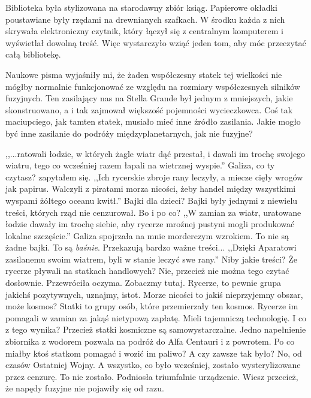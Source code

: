 Biblioteka była stylizowana na starodawny zbiór ksiąg.
Papierowe okładki poustawiane były rzędami na drewnianych szafkach.
W środku każda z nich skrywała elektroniczny czytnik, który łączył się z centralnym komputerem i wyświetlał dowolną treść.
Więc wystarczyło wziąć jeden tom, aby móc przeczytać całą bibliotekę.

Naukowe pisma wyjaśniły mi, że żaden współczesny statek tej wielkości nie mógłby normalnie funkcjonować ze względu na rozmiary współczesnych silników fuzyjnych.
Ten zasilający nas na Stella Grande był jednym z mniejszych, jakie skonstruowano, a i tak zajmował większość pojemności wycieczkowca.
Coś tak maciupciego, jak tamten statek, musiało mieć inne źródło zasilania.
Jakie mogło być inne zasilanie do podróży międzyplanetarnych, jak nie fuzyjne?

\begin{dialogue}
	\ds{} ,,...ratowali łodzie, w których żagle wiatr dąć przestał, i dawali im trochę swojego wiatru, tego co wcześniej razem łapali na wietrznej wyspie.''
	\ds{} Galiza, co ty czytasz? \dm{} zapytałem się.
	\ds{} ,,Ich rycerskie zbroje rany leczyły, a miecze cięły wrogów jak papirus. Walczyli z piratami morza nicości, żeby handel między wszystkimi wyspami żółtego oceanu kwitł.''
	\ds{} Bajki dla dzieci? \dm{} Bajki były jednymi z niewielu treści, których rząd nie cenzurował. Bo i po co?
	\ds{} ,,W zamian za wiatr, uratowane łodzie dawały im trochę siebie, aby rycerze mroźnej pustyni mogli produkować lokalne szczęście.'' \dm{} Galiza spojrzała na mnie morderczym wzrokiem. \dm{} To nie są żadne bajki. To są \emph{baśnie}. Przekazują bardzo ważne treści... ,,Dzięki Aparatowi zasilanemu swoim wiatrem, byli w stanie leczyć swe rany.''
	\ds{} Niby jakie treści? Że rycerze pływali na statkach handlowych?
	\ds{} Nie, przecież nie można tego czytać dosłownie. \dm{} Przewróciła oczyma. \dm{} Zobaczmy tutaj. Rycerze, to pewnie grupa jakichś pozytywnych, uznajmy, istot. Morze nicości to jakiś nieprzyjemny obszar, może kosmos? Statki to grupy osób, które przemierzały ten kosmos. Rycerze im pomagali w zamian za jakąś nietypową zapłatę. Mieli tajemniczą technologię.
	\ds{} I co z tego wynika? Przecież statki kosmiczne są samowystarczalne. Jedno napełnienie zbiornika z wodorem pozwala na podróż do Alfa Centauri i z powrotem. Po co miałby ktoś statkom pomagać i wozić im paliwo?
	\ds{} A czy zawsze tak było?
	\ds{} No, od czasów Ostatniej Wojny. A wszystko, co było wcześniej, zostało wysterylizowane przez cenzurę.
	\ds{} To nie zostało. \dm{} Podniosła triumfalnie urządzenie. \dm{} Wiesz przecież, że napędy fuzyjne nie pojawiły się od razu.

\end{dialogue}
